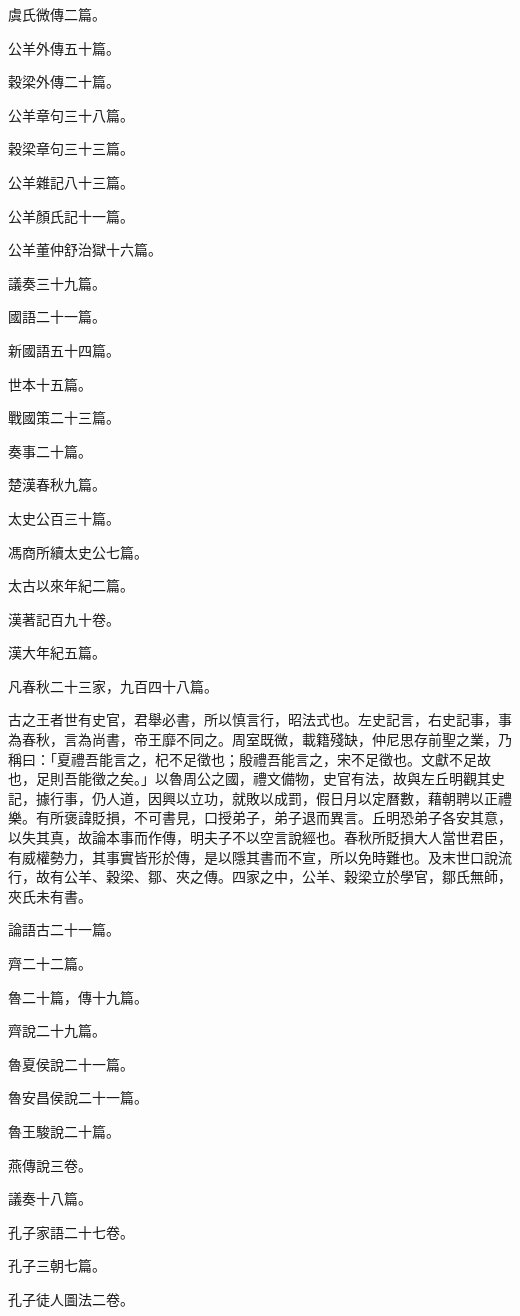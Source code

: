 \begin{pinyinscope}
虞氏微傳二篇。

公羊外傳五十篇。

穀梁外傳二十篇。

公羊章句三十八篇。

穀梁章句三十三篇。

公羊雜記八十三篇。

公羊顏氏記十一篇。

公羊董仲舒治獄十六篇。

議奏三十九篇。

國語二十一篇。

新國語五十四篇。

世本十五篇。

戰國策二十三篇。

奏事二十篇。

楚漢春秋九篇。

太史公百三十篇。

馮商所續太史公七篇。

太古以來年紀二篇。

漢著記百九十卷。

漢大年紀五篇。

凡春秋二十三家，九百四十八篇。

古之王者世有史官，君舉必書，所以慎言行，昭法式也。左史記言，右史記事，事為春秋，言為尚書，帝王靡不同之。周室既微，載籍殘缺，仲尼思存前聖之業，乃稱曰：「夏禮吾能言之，杞不足徵也；殷禮吾能言之，宋不足徵也。文獻不足故也，足則吾能徵之矣。」以魯周公之國，禮文備物，史官有法，故與左丘明觀其史記，據行事，仍人道，因興以立功，就敗以成罰，假日月以定曆數，藉朝聘以正禮樂。有所褒諱貶損，不可書見，口授弟子，弟子退而異言。丘明恐弟子各安其意，以失其真，故論本事而作傳，明夫子不以空言說經也。春秋所貶損大人當世君臣，有威權勢力，其事實皆形於傳，是以隱其書而不宣，所以免時難也。及末世口說流行，故有公羊、穀梁、鄒、夾之傳。四家之中，公羊、穀梁立於學官，鄒氏無師，夾氏未有書。

論語古二十一篇。

齊二十二篇。

魯二十篇，傳十九篇。

齊說二十九篇。

魯夏侯說二十一篇。

魯安昌侯說二十一篇。

魯王駿說二十篇。

燕傳說三卷。

議奏十八篇。

孔子家語二十七卷。

孔子三朝七篇。

孔子徒人圖法二卷。


\end{pinyinscope}
